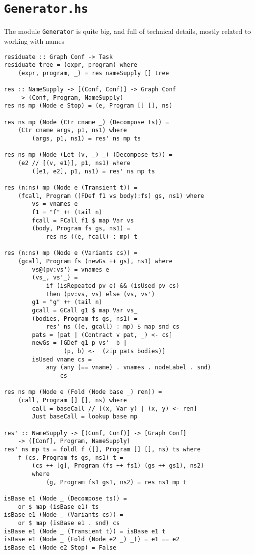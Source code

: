 \section{\texttt{Generator.hs}}

The module \texttt{Generator} is quite big, and full of technical details,
mostly related to working with names
\begin{lstlisting}[name=generator]
residuate :: Graph Conf -> Task
residuate tree = (expr, program) where
	(expr, program, _) = res nameSupply [] tree

res :: NameSupply -> [(Conf, Conf)] -> Graph Conf 
	-> (Conf, Program, NameSupply)
res ns mp (Node e Stop) = (e, Program [] [], ns)

res ns mp (Node (Ctr cname _) (Decompose ts)) = 
	(Ctr cname args, p1, ns1) where
		(args, p1, ns1) = res' ns mp ts

res ns mp (Node (Let (v, _) _) (Decompose ts)) = 
	(e2 // [(v, e1)], p1, ns1) where
		([e1, e2], p1, ns1) = res' ns mp ts

res (n:ns) mp (Node e (Transient t)) = 
	(fcall, Program ((FDef f1 vs body):fs) gs, ns1) where
		vs = vnames e
		f1 = "f" ++ (tail n)
		fcall = FCall f1 $ map Var vs
		(body, Program fs gs, ns1) = 
			res ns ((e, fcall) : mp) t

res (n:ns) mp (Node e (Variants cs)) = 
	(gcall, Program fs (newGs ++ gs), ns1) where
		vs@(pv:vs') = vnames e
		(vs_, vs'_) = 
			if (isRepeated pv e) && (isUsed pv cs) 
			then (pv:vs, vs) else (vs, vs')
		g1 = "g" ++ (tail n)
		gcall = GCall g1 $ map Var vs_
		(bodies, Program fs gs, ns1) = 
			res' ns ((e, gcall) : mp) $ map snd cs
		pats = [pat | (Contract v pat, _) <- cs]
		newGs = [GDef g1 p vs'_ b | 
				 (p, b) <-  (zip pats bodies)]
		isUsed vname cs = 
			any (any (== vname) . vnames . nodeLabel . snd) 
				cs

res ns mp (Node e (Fold (Node base _) ren)) = 
	(call, Program [] [], ns) where
		call = baseCall // [(x, Var y) | (x, y) <- ren]
		Just baseCall = lookup base mp

res' :: NameSupply -> [(Conf, Conf)] -> [Graph Conf] 
	-> ([Conf], Program, NameSupply)
res' ns mp ts = foldl f ([], Program [] [], ns) ts where
	f (cs, Program fs gs, ns1) t = 
		(cs ++ [g], Program (fs ++ fs1) (gs ++ gs1), ns2) 
		where
			(g, Program fs1 gs1, ns2) = res ns1 mp t

isBase e1 (Node _ (Decompose ts)) = 
	or $ map (isBase e1) ts
isBase e1 (Node _ (Variants cs)) = 
	or $ map (isBase e1 . snd) cs
isBase e1 (Node _ (Transient t)) = isBase e1 t
isBase e1 (Node _ (Fold (Node e2 _) _)) = e1 == e2
isBase e1 (Node e2 Stop) = False
\end{lstlisting}

